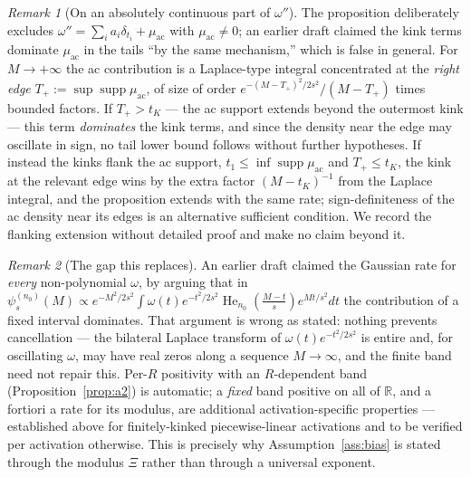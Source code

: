 \documentclass[11pt]{article}
\theoremstyle{remark}
\newtheorem{remark}{Remark}
\newcommand{\R}{\mathbb{R}}
\newcommand{\He}{\operatorname{He}}
\begin{document}
\begin{remark}[On an absolutely continuous part of $\omega''$]\label{rem:acpart}
The proposition deliberately excludes $\omega'' = \sum_i a_i\delta_{t_i} + \mu_{\mathrm{ac}}$ with $\mu_{\mathrm{ac}} \ne 0$; an earlier draft claimed the kink terms dominate $\mu_{\mathrm{ac}}$ in the tails ``by the same mechanism,'' which is false in general. For $M \to +\infty$ the ac contribution is a Laplace-type integral concentrated at the \emph{right edge} $T_+ := \sup\operatorname{supp}\mu_{\mathrm{ac}}$, of size of order $e^{-(M-T_+)^2/2s^2}/(M-T_+)$ times bounded factors. If $T_+ > t_K$ --- the ac support extends beyond the outermost kink --- this term \emph{dominates} the kink terms, and since the density near the edge may oscillate in sign, no tail lower bound follows without further hypotheses. If instead the kinks flank the ac support, $t_1 \le \inf\operatorname{supp}\mu_{\mathrm{ac}}$ and $T_+ \le t_K$, the kink at the relevant edge wins by the extra factor $(M-t_K)^{-1}$ from the Laplace integral, and the proposition extends with the same rate; sign-definiteness of the ac density near its edges is an alternative sufficient condition. We record the flanking extension without detailed proof and make no claim beyond it.
\end{remark}

\begin{remark}[The gap this replaces]\label{rem:no-rate}
An earlier draft claimed the Gaussian rate for \emph{every} non-polynomial $\omega$, by arguing that in $\psi_s^{(n_0)}(M) \propto e^{-M^2/2s^2}\int\omega(t)e^{-t^2/2s^2}\He_{n_0}(\tfrac{M-t}{s})e^{Mt/s^2}dt$ the contribution of a fixed interval dominates. That argument is wrong as stated: nothing prevents cancellation --- the bilateral Laplace transform of $\omega(t)e^{-t^2/2s^2}$ is entire and, for oscillating $\omega$, may have real zeros along a sequence $M \to \infty$, and the finite band need not repair this. Per-$R$ positivity with an $R$-dependent band (Proposition~\ref{prop:a2}) is automatic; a \emph{fixed} band positive on all of $\R$, and a fortiori a rate for its modulus, are additional activation-specific properties --- established above for finitely-kinked piecewise-linear activations and to be verified per activation otherwise. This is precisely why Assumption~\ref{ass:bias} is stated through the modulus $\Xi$ rather than through a universal exponent.
\end{remark}
\end{document}
